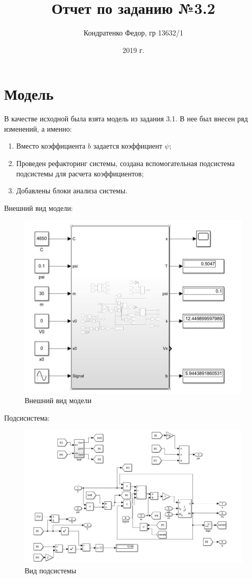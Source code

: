 \documentclass{article}
\date{2019 г.}
\author{Кондратенко Федор, гр 13632/1}
\title{Отчет по заданию №3.2}
\begin{document}
	\maketitle
	\section*{Модель}
	В качестве исходной была взята модель из задания 3.1. В нее был внесен ряд изменений, а именно:
	\begin{enumerate}
		\item Вместо коэффициента $b$ задается коэффициент $\psi$;
		\item Проведен рефакторинг системы, создана вспомогательная подсистема подсистемы для расчета коэффициентов;
		\item Добавлены блоки анализа системы.
	\end{enumerate}
	Внешний вид модели:
	\begin{figure}[H]
		\centering
		\includegraphics[width=0.7\linewidth]{model_outdoor}
		\caption{Внешний вид модели}
		\label{fig:modeloutdoor}
	\end{figure}
	Подсисистема:
	\begin{figure}[H]
		\centering
		\includegraphics[width=1.1\linewidth]{model_all}
		\caption{Вид подсистемы}
		\label{fig:modelall}
	\end{figure}
\end{document}

